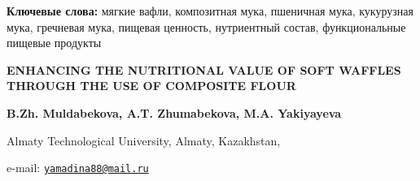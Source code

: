 {\bfseries Ключевые слова:} мягкие вафли, композитная мука, пшеничная мука,
кукурузная мука, гречневая мука, пищевая ценность, нутриентный состав,
функциональные пищевые продукты

\begin{articleheader}
{\bfseries ENHANCING THE NUTRITIONAL VALUE OF SOFT WAFFLES THROUGH THE USE
OF COMPOSITE FLOUR}

{\bfseries
B.Zh. Muldabekova,
A.T. Zhumabekova,
M.A. Yakiyayeva\textsuperscript{\envelope }
}
\end{articleheader}

\begin{affiliation}
Almaty Technological University, Almaty, Kazakhstan,

e-mail: \href{mailto:yamadina88@mail.ru}{\nolinkurl{yamadina88@mail.ru}}
\end{affiliation}

